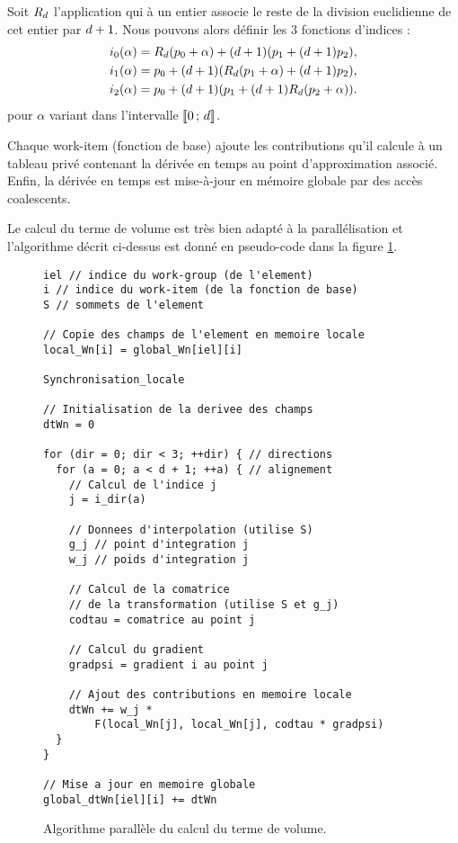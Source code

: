 Soit $R_d$ l’application qui à un entier associe le reste de la division
euclidienne de cet entier par $d + 1$.
Nous pouvons alors définir les $3$ fonctions d'indices :
\begin{equation}
	\begin{aligned}
		i_0(\alpha) &=
			R_d({p_{0}} + \alpha) +
			(d + 1) ({p_{1}} + (d + 1) {p_{2}}) , \\
		i_1(\alpha) &=
			{p_{0}} + (d + 1) (R_d({p_{1}} + \alpha) +
			(d + 1) {p_{2}}) , \\
		i_2(\alpha) &=
			{p_{0}} + (d + 1) ({p_{1}} +
			(d + 1) R_d({p_{2}} + \alpha)) .
	\end{aligned}
\end{equation}
pour $\alpha$ variant dans l'intervalle $\lbrack\!\lbrack0\,;\,d\rbrack\!\rbrack$.

Chaque work-item (fonction de base) ajoute les contributions qu’il calcule à un tableau privé
contenant la dérivée en temps au point d'approximation associé.
Enfin, la dérivée en temps est mise-à-jour en mémoire globale par des accès coalescents.

Le calcul du terme de volume est très bien adapté à la parallélisation 
et l’algorithme décrit ci-dessus est donné en pseudo-code dans la figure
\ref{img:kernel_volume}.


\begin{figure}[!h]
	\begin{center}
		\caption{
			\label{img:kernel_volume}
			Algorithme parallèle du calcul du terme de volume.
		}
		
		\begin{lstlisting}
iel // indice du work-group (de l'element)
i // indice du work-item (de la fonction de base)
S // sommets de l'element

// Copie des champs de l'element en memoire locale
local_Wn[i] = global_Wn[iel][i]

Synchronisation_locale

// Initialisation de la derivee des champs
dtWn = 0

for (dir = 0; dir < 3; ++dir) { // directions
  for (a = 0; a < d + 1; ++a) { // alignement
    // Calcul de l'indice j
    j = i_dir(a)
    
    // Donnees d'interpolation (utilise S)
    g_j // point d'integration j
    w_j // poids d'integration j
    
    // Calcul de la comatrice
    // de la transformation (utilise S et g_j)
    codtau = comatrice au point j
    
    // Calcul du gradient
    gradpsi = gradient i au point j
    
    // Ajout des contributions en memoire locale
    dtWn += w_j *
        F(local_Wn[j], local_Wn[j], codtau * gradpsi)
  }
}

// Mise a jour en memoire globale
global_dtWn[iel][i] += dtWn
		\end{lstlisting}
	\end{center}
\end{figure}


